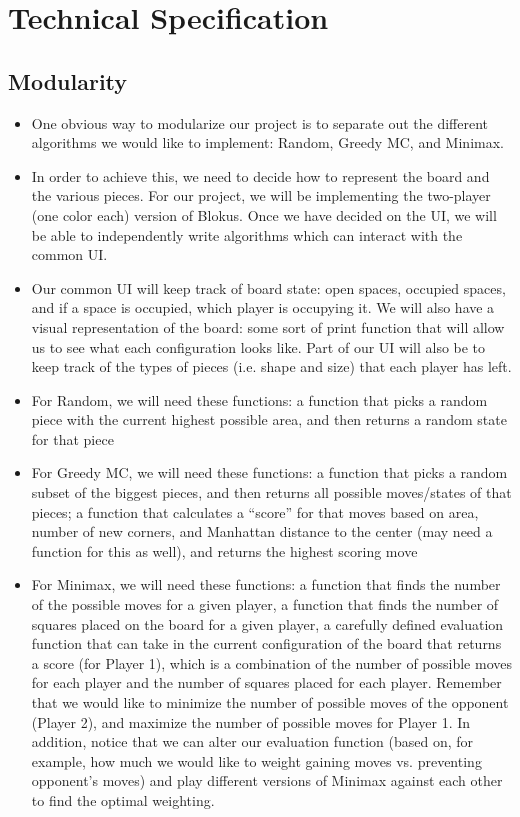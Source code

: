 \documentclass[11pt]{article}
\begin{document}
\vspace{2mm}


\pagebreak


\section{Technical Specification}

\subsection*{Modularity}
\begin{itemize}
\item One obvious way to modularize our project is to separate out the different algorithms we would like to implement: Random, Greedy MC, and Minimax.
\item In order to achieve this, we need to decide how to represent the board and the various pieces. For our project, we will be implementing the two-player (one color each) version of Blokus. Once we have decided on the UI, we will be able to independently write algorithms which can interact with the common UI.
\item Our common UI will keep track of board state: open spaces, occupied spaces, and if a space is occupied, which player is occupying it. We will also have a visual representation of the board: some sort of print function that will allow us to see what each configuration looks like. Part of our UI will also be to keep track of the types of pieces (i.e. shape and size) that each player has left.
\item For Random, we will need these functions: a function that picks a random piece with the current highest possible area, and then returns a random state for that piece
\item For Greedy MC, we will need these functions: a function that picks a random subset of the biggest pieces, and then returns all possible moves/states of that pieces; a function that calculates a ``score'' for that moves based on area, number of new corners, and Manhattan distance to the center (may need a function for this as well), and returns the highest scoring move 
\item For Minimax, we will need these functions: a function that finds the number of the possible moves for a given player, a function that finds the number of squares placed on the board for a given player, a carefully defined evaluation function that can take in the current configuration of the board that returns a score (for Player 1), which is a combination of the number of possible moves for each player and the number of squares placed for each player. Remember that we would like to minimize the number of possible moves of the opponent (Player 2), and maximize the number of possible moves for Player 1. In addition, notice that we can alter our evaluation function (based on, for example, how much we would like to weight gaining moves vs. preventing opponent's moves) and play different versions of Minimax against each other to find the optimal weighting.
\end{itemize}
\end{document}
